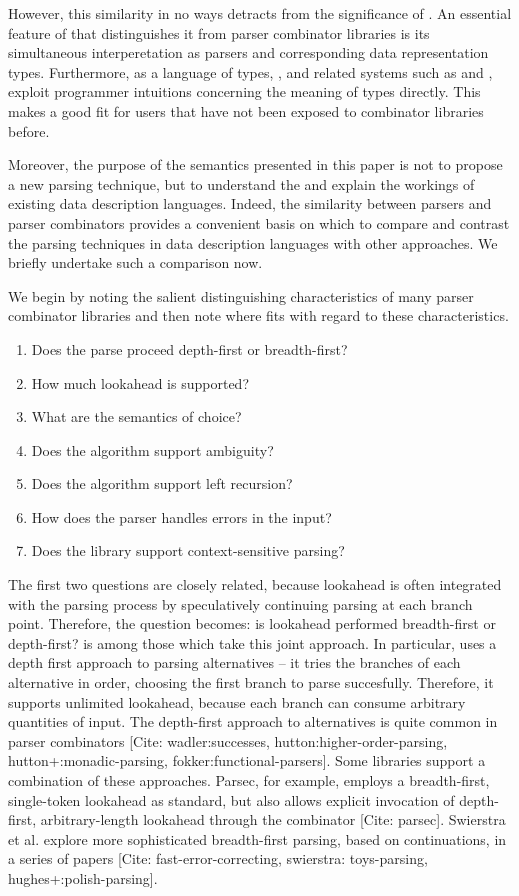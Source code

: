 However, this similarity in no ways detracts from the significance of \ddc{}. An essential feature of \ddc{} that distinguishes it from parser combinator libraries is its simultaneous interperetation as parsers and corresponding data representation types. Furthermore, as a language of types,
\ddc{}, and related systems such as \pads{} and \packettypes, exploit
programmer intuitions concerning the meaning of types directly.  
This makes \pads{} a good fit for users that have not been exposed to
combinator libraries before.

Moreover, the purpose of the semantics presented in this paper is not to propose a new parsing technique, but to understand the and explain the workings of existing data description languages. Indeed, the similarity between \ddc{} parsers and parser combinators provides a convenient basis on which to compare and contrast the parsing techniques in data description languages with other approaches. We briefly undertake such a comparison now.

We begin by noting the salient distinguishing characteristics of many parser combinator libraries and then note where \ddc{} fits with regard to these characteristics. 
\begin{enumerate}
\item Does the parse proceed depth-first or breadth-first?
\item How much lookahead is supported?
\item What are the semantics of choice?
\item Does the algorithm support ambiguity?
\item Does the algorithm support left recursion?
\item How does the parser handles errors in the input?
\item Does the library support context-sensitive parsing?
\end{enumerate}

The first two questions are closely related, because lookahead is often integrated with the parsing process by speculatively continuing parsing at each branch point. Therefore, the question becomes: is lookahead performed breadth-first or depth-first?  \ddc{} is among those which take this joint approach. In particular, \ddc{} uses a depth first approach to parsing alternatives -- it tries the branches of each alternative in order, choosing the first branch to parse succesfully. Therefore, it supports unlimited lookahead, because each branch can consume arbitrary quantities of input. The depth-first approach to alternatives is quite common in parser combinators [Cite: wadler:successes, hutton:higher-order-parsing, hutton+:monadic-parsing, fokker:functional-parsers]. Some libraries support a combination of these approaches. Parsec, for example, employs a breadth-first, single-token lookahead as standard, but also allows explicit invocation of depth-first, arbitrary-length lookahead through the  combinator [Cite: parsec]. Swierstra et al. explore more sophisticated breadth-first parsing, based on continuations, in a series of papers [Cite: fast-error-correcting, swierstra: toys-parsing, hughes+:polish-parsing].

